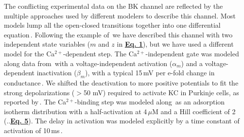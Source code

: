 \documentclass[12pt]{article}
\begin{document}
The conflicting experimental data on the BK channel are reflected by the multiple approaches used by different modelers to describe this channel. Most models lump all the open-closed transitions together into one differential equation\,\cite{hines84:_effic, Moczydlowski:1983qa, D:1982lh, Yamada-W:1989bs}. Following the example of\,\cite{Traub-R-D:1991mi} we have described this channel with two independent state variables ($m$ and $z$ in \href{../pub-purkinje-deschutter-equations/pub-purkinje-deschutter-equations.tex}{\bf Eq. 1}), but we have used a different model for the Ca$^{2+}$-dependent step. The Ca$^{2+}$-independent gate was modeled along data from\,\cite{Gola:1990pi} with a voltage-independent activation ($\alpha_m$) and a voltage-dependent inactivation ($\beta_m$), with a typical 15\,mV per e-fold change in conductance\,\cite{Franciolini:1988fu, Latorre:1989fu}. We shifted the deactivation to more positive potentials to fit the strong depolarizations ($>$50 mV) required to activate KC in Purkinje cells, as reported by\,\cite{Gruol:1991dz}. The Ca$^{2+}$-binding step was modeled along\,\cite{Franciolini:1988fu} as an adsorption isotherm distribution with a half-activation at 4\,$\mu$M and a Hill coefficient of 2 (..\href{pub-purkinje-deschutter-equations/pub-purkinje-deschutter-equations.tex}{\bf Eq. 5}). The delay in activation was modeled explicitly by a time constant of activation of 10\,ms\,\cite{Gola:1990pi, Ikemoto:1989lh, L:1989ff}.



\end{document}
